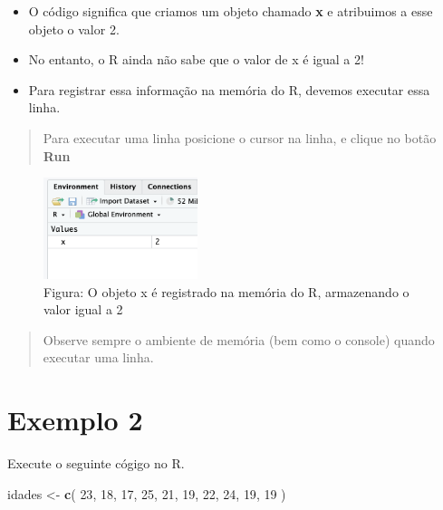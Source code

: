 \documentclass[
]{book}
\newenvironment{Shaded}{\begin{snugshade}}{\end{snugshade}}
\newcommand{\DecValTok}[1]{\textcolor[rgb]{0.00,0.00,0.81}{#1}}
\newcommand{\FunctionTok}[1]{\textcolor[rgb]{0.13,0.29,0.53}{\textbf{#1}}}
\newcommand{\NormalTok}[1]{#1}
\newcommand{\OtherTok}[1]{\textcolor[rgb]{0.56,0.35,0.01}{#1}}
\begin{document}
\begin{itemize}
\item
  O código significa que criamos um objeto chamado \textbf{x} e atribuimos a esse objeto o valor 2.
\item
  No entanto, o R ainda não sabe que o valor de x é igual a 2!
\item
  Para registrar essa informação na memória do R, devemos executar essa linha.
\end{itemize}

\begin{quote}
Para executar uma linha posicione o cursor na linha, e clique no botão \textbf{Run}
\end{quote}

\begin{figure}
\centering
\includegraphics[width=0.4\textwidth,height=\textheight]{telaValorMemoria.png}
\caption{Figura: O objeto x é registrado na memória do R, armazenando o valor igual a 2}
\end{figure}

\begin{quote}
Observe sempre o ambiente de memória (bem como o console) quando executar uma linha.
\end{quote}

\section{Exemplo 2}\label{exemplo-2}

Execute o seguinte cógigo no R.

\begin{Shaded}
\begin{Highlighting}[]
\NormalTok{idades }\OtherTok{\textless{}{-}} \FunctionTok{c}\NormalTok{( }\DecValTok{23}\NormalTok{, }\DecValTok{18}\NormalTok{, }\DecValTok{17}\NormalTok{, }\DecValTok{25}\NormalTok{, }\DecValTok{21}\NormalTok{, }\DecValTok{19}\NormalTok{, }\DecValTok{22}\NormalTok{, }\DecValTok{24}\NormalTok{, }\DecValTok{19}\NormalTok{, }\DecValTok{19}\NormalTok{ )}
\end{Highlighting}
\end{Shaded}
\end{document}
